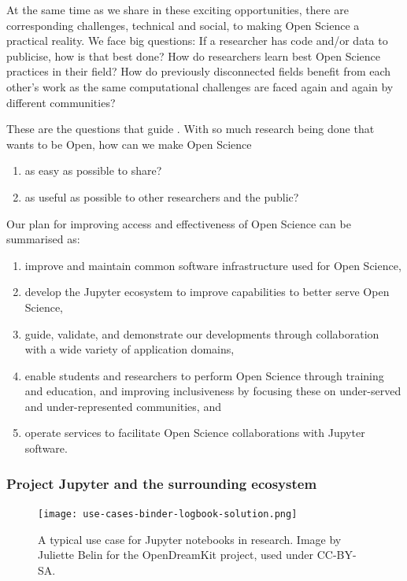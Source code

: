 At the same time as we share in these exciting opportunities, there
are corresponding challenges, technical and social, to making Open
Science a practical reality.  We face big questions: If a researcher
has code and/or data to publicise, how is that best done?  How do
researchers learn best Open Science practices in their field?  How do
previously disconnected fields benefit from each other's work as the
same computational challenges are faced again and again by different
communities?

These are the questions that guide \TheProject.
With so much research being done that wants to be Open,
how can we make Open Science

\begin{enumerate}
    \item as easy as possible to share?
    \item as useful as possible to other researchers and the public?
\end{enumerate}

\noindent Our plan for improving access and effectiveness of Open Science can be summarised as:

\begin{enumerate}
\item improve and maintain common software infrastructure used for
  Open Science,
\item develop the Jupyter ecosystem to improve capabilities to better
  serve Open Science,
\item guide, validate, and demonstrate our developments through
  collaboration with a wide variety of application domains,
\item enable students and researchers to perform Open Science through
  training and education, and improving inclusiveness by focusing
  these on under-served and under-represented communities, and
\item operate services to facilitate Open Science collaborations with
  Jupyter software.
\end{enumerate}

\medskip

\subsubsection{Project Jupyter and the surrounding ecosystem}
\label{sec:project-jupyter}

\begin{figure}[htb]\centering
  \texttt{[image: use-cases-binder-logbook-solution.png]}
  \caption{A typical use case for Jupyter notebooks in research.
            Image by Juliette Belin for the OpenDreamKit project, used under
            CC-BY-SA.}\label{fig:use-cases-binder}
\end{figure}

